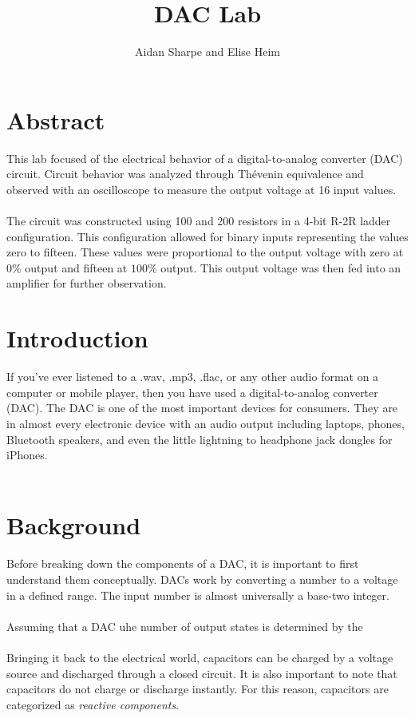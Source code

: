 \documentclass{hitec}
\title{DAC Lab}
\author{Aidan Sharpe and Elise Heim}
\begin{document}
	\maketitle
	\section{Abstract}
	This lab focused of the electrical behavior of a digital-to-analog converter (DAC) circuit. Circuit behavior was analyzed through Thévenin equivalence and observed with an oscilloscope to measure the output voltage at 16 input values. 
	\\
	\\
	\noindent
	The circuit was constructed using 100 and 200 resistors in a 4-bit R-2R ladder configuration. This configuration allowed for binary inputs representing the values zero to fifteen. These values were proportional to the output voltage with zero at $0\%$ output and fifteen at $100\%$ output. This output voltage was then fed into an amplifier for further observation.
	
	\section{Introduction}
	If you've ever listened to a .wav, .mp3, .flac, or any other audio format on a computer or mobile player, then you have used a digital-to-analog converter (DAC). The DAC is one of the most important devices for consumers. They are in almost every electronic device with an audio output including laptops, phones, Bluetooth speakers, and even the little lightning to headphone jack dongles for iPhones. 
	\\
	\\
	\noindent
	
	
	\section{Background}
	Before breaking down the components of a DAC, it is important to first understand them conceptually. DACs work by converting a number to a voltage in a defined range. The input number is almost universally a base-two integer.
	\\
	\\
	\noindent
	Assuming that a DAC uhe number of output states is determined by the
	\\
	\\
	\noindent
	Bringing it back to the electrical world, capacitors can be charged by a voltage source and discharged through a closed circuit. It is also important to note that capacitors do not charge or discharge instantly. For this reason, capacitors are categorized as \textit{reactive components}.
	
\end{document}
